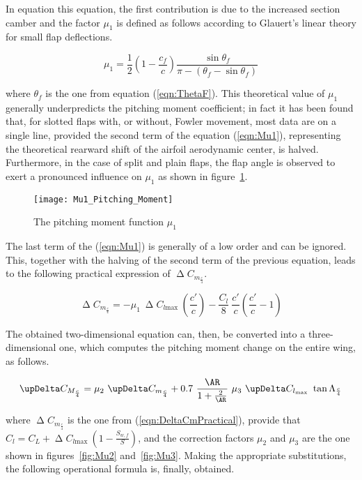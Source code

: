 In equation this equation, the first contribution is due to the increased section camber and the factor $\mu_1$ is defined as follows according to Glauert's linear theory for small flap deflections.

\begin{equation}
\mu_1=\dfrac{1}{2}\left(1-\dfrac{c_f}{c}\right)\dfrac{\sin\theta_f}{\pi-\left(\theta_f-\sin\theta_f\right)}
\label{eqn:Mu1}
\end{equation}

where $\theta_f$ is the one from equation (\ref{eqn:ThetaF}). This theoretical value of $\mu_1$ generally underpredicts the pitching moment coefficient; in fact it has been found that, for slotted flaps with, or without, Fowler movement, most data are on a single line, provided the second term of the equation (\ref{eqn:Mu1}), representing the theoretical rearward shift of the airfoil aerodynamic center, is halved. Furthermore, in the case of split and plain flaps, the flap angle is observed to exert a pronounced influence on $\mu_1$ as shown in figure~\ref{fig:Mu1}.

\begin{figure}[!b]
  \centering
  \texttt{[image: Mu1\_Pitching\_Moment]}
  \caption{The pitching moment function $\mu_1$}
  \label{fig:Mu1}
\end{figure}

The last term of the (\ref{eqn:Mu1}) is generally of a low order and can be ignored. This, together with the halving of the second term of the previous equation, leads to the following practical expression of $\upDelta C_{m_{\frac{c}{4}}}$.

\begin{equation}
\upDelta C_{m_{\frac{c}{4}}}=-\mu_1\ \upDelta C_{l\text{max}}\ \left(\dfrac{c'}{c}\right)-\dfrac{C_l}{8}\ \dfrac{c'}{c}\left(\dfrac{c'}{c}-1\right)
\label{eqn:DeltaCmPractical}
\end{equation}

\bigskip
\noindent
The obtained two-dimensional equation can, then, be converted into a three-dimensional one, which computes the pitching moment change on the entire wing, as follows.

\begin{equation}
\upDelta C_{M_{\frac{c}{4}}}=\mu_2\ \upDelta C_{m_{\frac{c}{4}}}+0.7\ \dfrac{\AR}{1+\frac{2}{\AR}}\ \mu_3\ \upDelta C_{l_{\text{max}}}\ \tan\Lambda_{\frac{c}{4}}
\label{eqn:DeltaCM}
\end{equation}

where $\upDelta C_{m_{\frac{c}{4}}}$ is the one from (\ref{eqn:DeltaCmPractical}), provide that $C_l=C_L+\upDelta C_{l\text{max}}\ \left(1-\frac{S_{w,f}}{S}\right)$, and the correction factors $\mu_2$ and $\mu_3$ are the one shown in figures~\ref{fig:Mu2} and~\ref{fig:Mu3}. Making the appropriate substitutions, the following operational formula is, finally, obtained.

